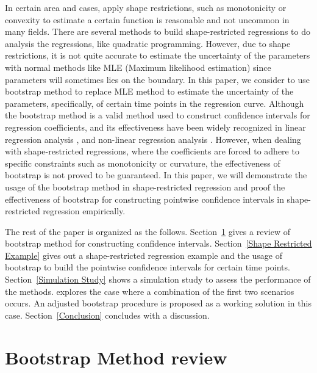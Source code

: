 \documentclass[12pt]{article}
\begin{document}
In certain area and cases, apply shape restrictions, such as monotonicity or convexity to estimate a certain function is reasonable and not uncommon in many fields.\cite{guo2019smooth} There are several methods to build shape-restricted regressions to do analysis the regressions, like quadratic programming.\cite{meyer2013simple} However, due to shape restrictions, it is not quite accurate to estimate the uncertainty of the parameters with normal methods like MLE (Maximum likelihood estimation) since parameters will sometimes lies on the boundary. In this paper, we consider to use bootstrap method to replace MLE method to estimate the uncertainty of the parameters, specifically, of certain time points in the regression curve. Although the bootstrap method is a valid method used to construct confidence intervals for regression coefficients, \cite{efron1985bootstrap}and its effectiveness have been widely recognized in linear regression analysis \cite{efron1979bootstrap}, and non-linear regression analysis \cite{davidson1999bootstrap}. However, when dealing with shape-restricted regressions, where the coefficients are forced to adhere to specific constraints such as monotonicity or curvature, the effectiveness of bootstrap is not proved to be guaranteed. In this paper, we will demonstrate the usage of the bootstrap method in shape-restricted regression and proof the effectiveness of bootstrap for constructing pointwise confidence intervals in shape-restricted regression empirically. 

The rest of the paper is organized as the follows. Section~\ref{Bootstrap Method for Constructing Confidence Intervals} gives a review of bootstrap method for constructing confidence intervals. Section~\ref{Shape Restricted Example} gives out a shape-restricted regression example and the usage of bootstrap to build the pointwise confidence intervals for certain time points. Section~\ref{Simulation Study} shows a simulation study to assess the performance of the methods.
explores the case where a combination of the first two scenarios occurs. An  
adjusted bootstrap procedure is proposed as a working solution in this case.  
Section~\ref{Conclusion} concludes with a discussion.




\section{Bootstrap Method review}
\label{Bootstrap Method for Constructing Confidence Intervals}
\end{document}

